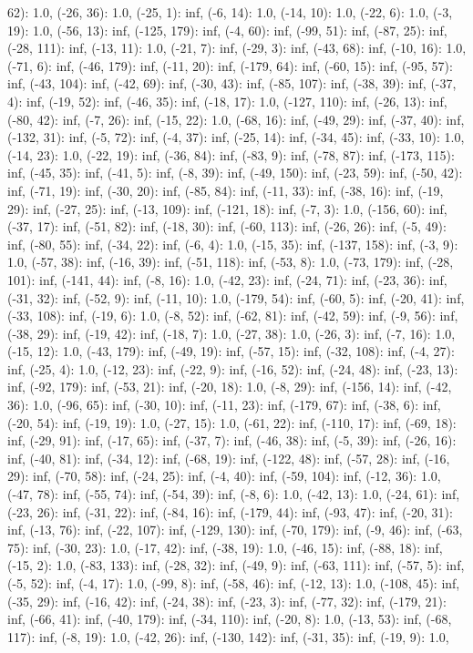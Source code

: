 \documentclass[parskip=half]{scrartcl}
\begin{document}
62): 1.0, (-26, 36): 1.0, (-25, 1): inf, (-6, 14): 1.0, (-14, 10): 1.0, (-22, 6): 1.0, (-3, 19): 1.0, (-56, 13): inf, (-125, 179): inf, (-4, 60): inf, (-99, 51): inf, (-87, 25): inf, (-28, 111): inf, (-13, 11): 1.0, (-21, 7): inf, (-29, 3): inf, (-43, 68): inf, (-10, 16): 1.0, (-71, 6): inf, (-46, 179): inf, (-11, 20): inf, (-179, 64): inf, (-60, 15): inf, (-95, 57): inf, (-43, 104): inf, (-42, 69): inf, (-30, 43): inf, (-85, 107): inf, (-38, 39): inf, (-37, 4): inf, (-19, 52): inf, (-46, 35): inf, (-18, 17): 1.0, (-127, 110): inf, (-26, 13): inf, (-80, 42): inf, (-7, 26): inf, (-15, 22): 1.0, (-68, 16): inf, (-49, 29): inf, (-37, 40): inf, (-132, 31): inf, (-5, 72): inf, (-4, 37): inf, (-25, 14): inf, (-34, 45): inf, (-33, 10): 1.0, (-14, 23): 1.0, (-22, 19): inf, (-36, 84): inf, (-83, 9): inf, (-78, 87): inf, (-173, 115): inf, (-45, 35): inf, (-41, 5): inf, (-8, 39): inf, (-49, 150): inf, (-23, 59): inf, (-50, 42): inf, (-71, 19): inf, (-30, 20): inf, (-85, 84): inf, (-11, 33): inf, (-38, 16): inf, (-19, 29): inf, (-27, 25): inf, (-13, 109): inf, (-121, 18): inf, (-7, 3): 1.0, (-156, 60): inf, (-37, 17): inf, (-51, 82): inf, (-18, 30): inf, (-60, 113): inf, (-26, 26): inf, (-5, 49): inf, (-80, 55): inf, (-34, 22): inf, (-6, 4): 1.0, (-15, 35): inf, (-137, 158): inf, (-3, 9): 1.0, (-57, 38): inf, (-16, 39): inf, (-51, 118): inf, (-53, 8): 1.0, (-73, 179): inf, (-28, 101): inf, (-141, 44): inf, (-8, 16): 1.0, (-42, 23): inf, (-24, 71): inf, (-23, 36): inf, (-31, 32): inf, (-52, 9): inf, (-11, 10): 1.0, (-179, 54): inf, (-60, 5): inf, (-20, 41): inf, (-33, 108): inf, (-19, 6): 1.0, (-8, 52): inf, (-62, 81): inf, (-42, 59): inf, (-9, 56): inf, (-38, 29): inf, (-19, 42): inf, (-18, 7): 1.0, (-27, 38): 1.0, (-26, 3): inf, (-7, 16): 1.0, (-15, 12): 1.0, (-43, 179): inf, (-49, 19): inf, (-57, 15): inf, (-32, 108): inf, (-4, 27): inf, (-25, 4): 1.0, (-12, 23): inf, (-22, 9): inf, (-16, 52): inf, (-24, 48): inf, (-23, 13): inf, (-92, 179): inf, (-53, 21): inf, (-20, 18): 1.0, (-8, 29): inf, (-156, 14): inf, (-42, 36): 1.0, (-96, 65): inf, (-30, 10): inf, (-11, 23): inf, (-179, 67): inf, (-38, 6): inf, (-20, 54): inf, (-19, 19): 1.0, (-27, 15): 1.0, (-61, 22): inf, (-110, 17): inf, (-69, 18): inf, (-29, 91): inf, (-17, 65): inf, (-37, 7): inf, (-46, 38): inf, (-5, 39): inf, (-26, 16): inf, (-40, 81): inf, (-34, 12): inf, (-68, 19): inf, (-122, 48): inf, (-57, 28): inf, (-16, 29): inf, (-70, 58): inf, (-24, 25): inf, (-4, 40): inf, (-59, 104): inf, (-12, 36): 1.0, (-47, 78): inf, (-55, 74): inf, (-54, 39): inf, (-8, 6): 1.0, (-42, 13): 1.0, (-24, 61): inf, (-23, 26): inf, (-31, 22): inf, (-84, 16): inf, (-179, 44): inf, (-93, 47): inf, (-20, 31): inf, (-13, 76): inf, (-22, 107): inf, (-129, 130): inf, (-70, 179): inf, (-9, 46): inf, (-63, 75): inf, (-30, 23): 1.0, (-17, 42): inf, (-38, 19): 1.0, (-46, 15): inf, (-88, 18): inf, (-15, 2): 1.0, (-83, 133): inf, (-28, 32): inf, (-49, 9): inf, (-63, 111): inf, (-57, 5): inf, (-5, 52): inf, (-4, 17): 1.0, (-99, 8): inf, (-58, 46): inf, (-12, 13): 1.0, (-108, 45): inf, (-35, 29): inf, (-16, 42): inf, (-24, 38): inf, (-23, 3): inf, (-77, 32): inf, (-179, 21): inf, (-66, 41): inf, (-40, 179): inf, (-34, 110): inf, (-20, 8): 1.0, (-13, 53): inf, (-68, 117): inf, (-8, 19): 1.0, (-42, 26): inf, (-130, 142): inf, (-31, 35): inf, (-19, 9): 1.0, 
\end{document}
